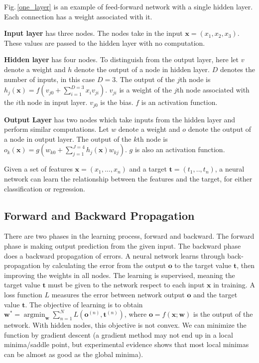 Fig.\,\ref{one_layer} is an example of feed-forward network with a single hidden layer. Each connection has a weight associated with it.

\textbf{Input layer} has three nodes. The nodes take in the input $\mathbf{x} = (x_1,x_2,x_3)$. These values are passed to the hidden layer with no computation.

\textbf{Hidden layer} has four nodes. To distinguish from the output layer, here let $v$ denote a weight and $h$ denote the output of a node in hidden layer. $D$ denotes the number of inputs, in this case $D=3$. The output of the $j$th node is $h_j(\mathbf{x}) = f(v_{j0}+\sum_{i=1}^{D=3} x_iv_{ji})$. $v_{ji}$ is a weight of the $j$th node associated with the $i$th node in input layer. $v_{j0}$ is the bias. $f$ is an activation function.

\textbf{Output Layer} has two nodes which take inputs from the hidden layer and perform similar computations.
Let $w$ denote a weight and $o$ denote the output of a node in output layer. The output of the $k$th node is $o_k(\mathbf{x}) = g(w_{k0}+\sum_{j=1}^{J=4} h_j(\mathbf{x}) w_{kj})$. $g$ is also an activation function.

Given a set of features $\mathbf{x} = (x_1,...,x_n)$ and a target $\mathbf{t} = (t_1,..,t_n)$, a neural network can learn the relationship between the features and the target, for either classification or regression.

\newcommand{\argminE}{\mathop{\mathrm{argmin}}}  

\subsection{Forward and Backward Propagation}
\label{back-prob}
There are two phases in the learning process, forward and backward. The forward phase is making output prediction from the given input. The backward phase does a backward propagation of errors. A neural network learns through back-propagation by calculating the error from the output $\mathbf{o}$ to the target value $\mathbf{t}$, then improving the weights in all nodes. The learning is supervised, meaning the target value $\mathbf{t}$ must be given to the network respect to each input  $\mathbf{x}$ in training. A loss function $L$ measures the error between network output $\mathbf{o}$ and the target value $\mathbf{t}$. The objective of learning is to obtain $\mathbf{w}^* = \argminE_\mathbf{w} \sum_{n=1}^N L(\mathbf{o}^{(n)},\mathbf{t}^{(n)})$, where $\mathbf{o} = f(\mathbf{x};\mathbf{w})$ is the output of the network. With hidden nodes, this objective is not convex. We can minimize the function by gradient descent (a gradient method may not end up in a local minima/saddle point, but experimental evidence shows that most local minimas can be almost as good as the global minima).

